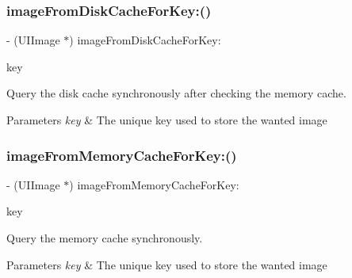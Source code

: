 \subsubsection{\texorpdfstring{image\+From\+Disk\+Cache\+For\+Key\+:()}{imageFromDiskCacheForKey:()}\hspace{0.1cm}{\footnotesize\ttfamily [3/3]}}
{\footnotesize\ttfamily -\/ (U\+I\+Image $\ast$) image\+From\+Disk\+Cache\+For\+Key\+: \begin{DoxyParamCaption}\item[{(N\+S\+String $\ast$)}]{key }\end{DoxyParamCaption}}

Query the disk cache synchronously after checking the memory cache.


\begin{DoxyParams}{Parameters}
{\em key} & The unique key used to store the wanted image \\
\hline
\end{DoxyParams}
\mbox{\label{interface_s_d_image_cache_abe13b43b333bbb5bbe56142b8d573bd2}} 
\subsubsection{\texorpdfstring{image\+From\+Memory\+Cache\+For\+Key\+:()}{imageFromMemoryCacheForKey:()}\hspace{0.1cm}{\footnotesize\ttfamily [1/3]}}
{\footnotesize\ttfamily -\/ (U\+I\+Image $\ast$) image\+From\+Memory\+Cache\+For\+Key\+: \begin{DoxyParamCaption}\item[{(N\+S\+String $\ast$)}]{key }\end{DoxyParamCaption}}

Query the memory cache synchronously.


\begin{DoxyParams}{Parameters}
{\em key} & The unique key used to store the wanted image \\
\hline
\end{DoxyParams}
\mbox{\label{interface_s_d_image_cache_abe13b43b333bbb5bbe56142b8d573bd2}} 

